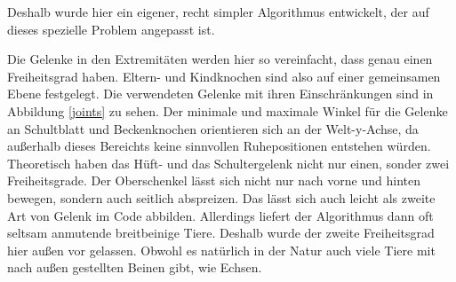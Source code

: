 Deshalb wurde hier ein eigener, recht simpler Algorithmus entwickelt, der auf dieses spezielle Problem angepasst ist.

Die Gelenke in den Extremitäten werden hier so vereinfacht, dass genau einen Freiheitsgrad haben. Eltern- und Kindknochen sind also auf einer gemeinsamen Ebene festgelegt. Die verwendeten Gelenke mit ihren Einschränkungen sind in Abbildung \ref{joints} zu sehen. Der minimale und maximale Winkel für die Gelenke an Schultblatt und Beckenknochen orientieren sich an der Welt-y-Achse, da außerhalb dieses Bereichts keine sinnvollen Ruhepositionen entstehen würden. \\
Theoretisch haben das Hüft- und das Schultergelenk nicht nur einen, sonder zwei Freiheitsgrade. Der Oberschenkel lässt sich nicht nur nach vorne und hinten bewegen, sondern auch seitlich abspreizen. Das lässt sich auch leicht als zweite Art von Gelenk im Code abbilden. Allerdings liefert der Algorithmus dann oft seltsam anmutende breitbeinige Tiere.
Deshalb wurde der zweite Freiheitsgrad hier außen vor gelassen.
Obwohl es natürlich in der Natur auch viele Tiere mit nach außen gestellten Beinen gibt, wie \zb Echsen.


